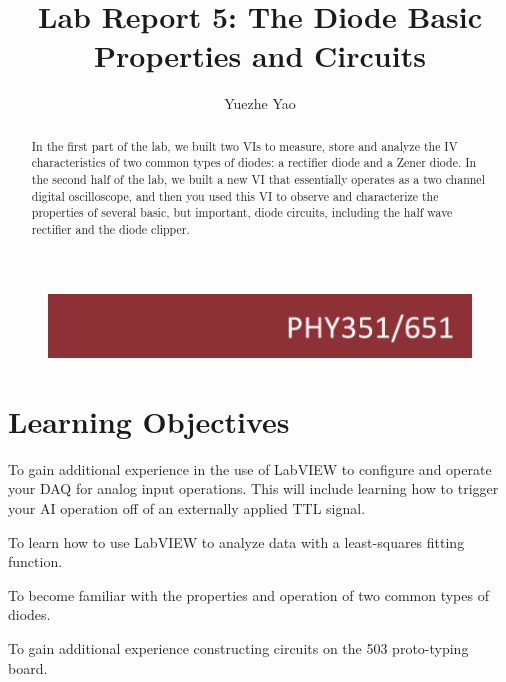 \documentclass[11pt]{article}
\begin{document}
\begin{figure}
  \includegraphics[width=\linewidth/3]{title}
  \label{fig:title}
\end{figure}


\title{Lab Report 5: The Diode Basic Properties and Circuits}


\author{Yuezhe Yao}




\maketitle

\begin{abstract}
In the first part of the lab, we built two VIs to measure, store and analyze the IV characteristics of two common types of diodes: a rectifier diode and a Zener diode.  In the second half of the lab, we built a new VI that essentially operates as a two channel digital oscilloscope, and then you used this VI to observe and characterize the properties of several basic, but important, diode circuits, including the half wave rectifier and the diode clipper.       
\end{abstract}

\medskip

\begingroup
\let\clearpage\relax
\tableofcontents
\endgroup

\medskip
\medskip

\section{Learning Objectives}



To gain additional experience in the use of LabVIEW to configure and operate your DAQ for analog input operations. This will include learning how to trigger your AI operation off of an externally applied TTL signal.

To learn how to use LabVIEW to analyze data with a least-squares fitting function.

To become familiar with the properties and operation of two common types of diodes.

To gain additional experience constructing circuits on the 503 proto-typing board.
\end{document}

